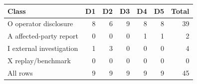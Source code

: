 \begin{tabular}{lrrrrrr}
\toprule
Class & D1 & D2 & D3 & D4 & D5 & Total \\
\midrule
O operator disclosure & 8 & 6 & 9 & 8 & 8 & 39 \\
A affected-party report & 0 & 0 & 0 & 1 & 1 & 2 \\
I external investigation & 1 & 3 & 0 & 0 & 0 & 4 \\
X replay/benchmark & 0 & 0 & 0 & 0 & 0 & 0 \\
All rows & 9 & 9 & 9 & 9 & 9 & 45 \\
\bottomrule
\end{tabular}

